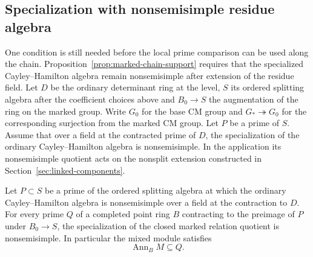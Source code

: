 \subsection{Specialization with nonsemisimple residue algebra}
\label{subsec:closed-link}
\hypertarget{source-ordinary-closed-link}{}

One condition is still needed before the local prime comparison can be used along the
chain. Proposition~\ref{prop:marked-chain-support} requires that the specialized Cayley--Hamilton algebra remain nonsemisimple after extension of the residue field.
Let \(D\) be the ordinary determinant ring at the level, \(S\) its
ordered splitting algebra after the coefficient choices above and
\(B_0\to S\) the augmentation of the ring on the marked group.
Write \(G_0\) for the base CM group and \(G_*\twoheadrightarrow G_0\)
for the corresponding surjection from the marked CM group. Let \(P\)
be a prime of \(S\). Assume that over a field at the contracted
prime of \(D\), the specialization of the ordinary
Cayley--Hamilton algebra is nonsemisimple.
In the application its nonsemisimple quotient acts on the nonsplit
extension constructed in Section~\ref{sec:linked-components}.

\begin{proposition}
\label{prop:marked-thick-realization}
Let \(P\subset S\) be a prime of the ordered splitting algebra
at which the ordinary Cayley--Hamilton algebra is nonsemisimple
over a field at the contraction to \(D\). For every prime \(Q\)
of a completed point ring \(B\) contracting to the preimage of
\(P\) under \(B_0\to S\), the specialization of the closed marked
relation quotient is nonsemisimple. In particular the mixed module satisfies 
\[
 \operatorname{Ann}_B M\subseteq Q.
\]

\end{proposition}

